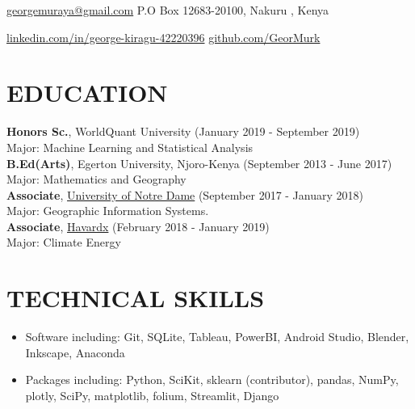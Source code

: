 \documentclass[line,margin,10pt]{res}
\begin{document}
 
\begin{resume}
\hoffset\centerline 
{\hyperref[georgemuraya@gmail.com]{georgemuraya@gmail.com} \quad \quad \quad \quad \quad \quad \quad \quad \quad \quad \quad \quad \quad \quad \quad\quad \quad \quad \quad \quad \quad \quad \quad \quad \quad \quad  \quad    P.O Box 12683-20100, Nakuru , Kenya}
\hoffset\centerline 
{\hspace{0.05cm} \hyperref[linkedin.com/in/george-kiragu-42220396]{linkedin.com/in/george-kiragu-42220396} \quad \quad \quad \quad \quad \quad \quad \quad \quad \quad \quad\quad \quad \quad \quad \quad \quad \quad \quad \quad \quad \quad  \quad \quad \quad  \quad \quad \quad   \quad \hyperref[github.com/GeorMurk]{github.com/GeorMurk}}
 
{\vspace{-0.25cm}}

\section{EDUCATION} 
\textbf{Honors Sc.}, WorldQuant University \hfill (January 2019 - September 2019)\\
Major: Machine Learning and Statistical Analysis \\
\textbf{B.Ed(Arts)}, Egerton University, Njoro-Kenya \hfill (September 2013 - June 2017)\\
Major: Mathematics and Geography \\ 
\textbf{Associate}, {\hyperref[https://edge.edx.org/courses/course-v1:NotreDame+GIS000+0000/courseware]{University of Notre Dame}} \hfill (September 2017 - January 2018)\\
Major: Geographic Information Systems. \\
\textbf{Associate}, {\hyperref[https://courses.edx.org/courses/course-v1:HarvardX+SPU29x+3T2016/course/]{Havardx}} \hfill (February 2018 - January 2019)\\
Major: Climate Energy \\

\section{TECHNICAL SKILLS} 
\begin{itemize}[leftmargin=-2pt] \itemsep -2pt
\item [] Software including: Git, SQLite, Tableau, PowerBI, Android Studio, Blender, Inkscape, Anaconda
\item []Packages including:  Python, SciKit, sklearn (contributor), pandas, NumPy, plotly, SciPy, matplotlib, folium, Streamlit, Django
\end{itemize}
{\vspace{-0.25cm}}


\end{resume}
\end{document}
